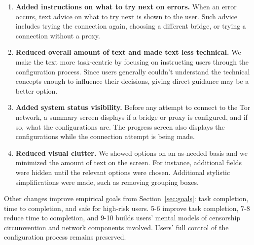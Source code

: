 \documentclass[USenglish,oneside,twocolumn]{article}
\begin{document}
\begin{enumerate}
\item {\bfseries Added instructions on what to try next on errors.} When an error occurs, text advice on what to try next is shown to the user. Such advice includes trying the connection again, choosing a different bridge, or trying a connection without a proxy. 
\item {\bfseries Reduced overall amount of text and made text less technical.} We make the text more task-centric by focusing on instructing users through the configuration process. Since users generally couldn't understand the technical concepts enough to influence their decisions, giving direct guidance may be a better option. 
\item {\bfseries Added system status visibility.} Before any attempt to connect to the Tor network, a summary screen displays if a bridge or proxy is configured, and if so, what the configurations are. The progress screen also displays the configurations while the connection attempt is being made. 
\item {\bfseries Reduced visual clutter.} We showed options on an as-needed basis and we minimized the amount of text on the screen. For instance, additional fields were hidden until the relevant options were chosen. Additional stylistic simplifications were made, such as removing grouping boxes. 
\end{enumerate} 

Other changes improve empirical goals from Section~\ref{sec:goals}: task completion, time to completion, and safe for high-risk users. 5-6 improve task completion, 7-8 reduce time to completion, and 9-10 builds users' mental models of censorship circumvention and network components involved. Users' full control of the configuration process remains preserved.\\
\end{document}
